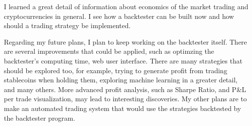 I learned a great detail of information about economics of the market trading and cryptocurrencies in general. I see how a backtester can be built now and how should a trading strategy be implemented.

Regarding my future plans, I plan to keep working on the backtester itself. There are several improvements that could be applied, such as optimzing the backtester's computing time, web user interface. There are many strategies that should be explored too, for example, trying to generate profit from trading stablecoins when holding them, exploring machine learning in a greater detail, and many others. More advanced profit analysis, such as Sharpe Ratio, and P\&L per trade visualization, may lead to interesting discoveries. My other plans are to make an automated trading system that would use the strategies backtested by the backtester program.
